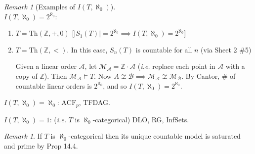 \documentclass[]{article}
\theoremstyle{custhm}
\theoremstyle{cusdef}
\theoremstyle{custhm}
\theoremstyle{custhm}
\theoremstyle{custhm}
\theoremstyle{ex}
\theoremstyle{custhm}
\theoremstyle{cusdef}
\theoremstyle{remark}
\newtheorem*{remark*}{Remark}
\theoremstyle{remark}
\newtheorem{remark}[theorem]{Remark}
\newcommand{\Z}{\mathbb{Z}}
\renewcommand{\it}[1]{\textit{#1}}
\newcommand{\M}{\mathcal{M}}
\newcommand{\Th}{\textrm{Th}}
\newcommand{\acf}{\textrm{ACF}}
\newcommand{\A}{\mathcal{A}}
\begin{document}
\begin{remark*}[Examples of $I(T,\aleph_0)$]\ \\
	\underline{$I(T,\aleph_0) = 2^{\aleph_0}$}:\ 
	\begin{enumerate}
		\item $T = \Th(\Z,+,0)$ [$|S_1(T)| = 2^{\aleph_0}\implies I(T,\aleph_0) = 2^{\aleph_0}$]
		\item $T = \Th(\Z,<)$. In this case, $S_n(T)$ is countable for all $n$ (via Sheet 2 \#5)
		
		Given a linear order $\A$, let $\M_\A = \Z\cdot \A$ (\it{i.e.} replace each point in $\A$ with a copy of $\Z$). Then $\M_\A\models T$. Now $A\not\cong \mathcal{B} \implies \M_\A \not\cong \M_{\mathcal{B}}$. By Cantor, \# of countable linear orders is $2^{\aleph_0}$, and so $I(T,\aleph_0) = 2^{\aleph_0}$.
	\end{enumerate}

	\underline{$I(T,\aleph_0) = \aleph_0$}: $\acf_p$, TFDAG.

	\underline{$I(T,\aleph_0) = 1$}: (\it{i.e.} $T$ is $\aleph_0$-categorical) DLO, RG, InfSets.
\end{remark*}

\begin{remark}
	If $T$ is $\aleph_0$-categorical then its unique countable model is saturated and prime by Prop 14.4.
\end{remark}
\end{document}
